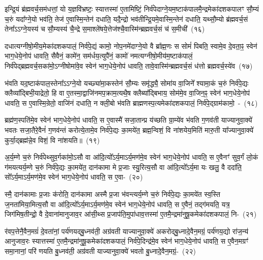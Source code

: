 इन्द्रि॒यं ब्र॑ह्मवर्च॒सम॑धत्तां॒ यो य॒ज्ञवि॑भ्रष्टः॒ स्यात्तस्मा॑ ए॒तामिष्टिं॒ निर्व॑पेदाग्ने॒यम॒ष्टाक॑पालमै॒न्द्रमेका॑\-दश\-कपालꣳ सौ॒म्यं च॒रुं यदा᳚ग्ने॒यो भव॑ति॒ तेज॑ ए॒वास्मि॒न्तेन॑ दधाति॒ यदै॒न्द्रो भव॑तीन्द्रि॒यमे॒वास्मि॒न्तेन॑ दधाति॒ यथ्सौ॒म्यो ब्र॑ह्मवर्च॒सं तेना᳚\-ऽऽ\-ग्ने॒यस्य॑ च सौ॒म्यस्य॑ चै॒न्द्रे स॒माश्ले॑षये॒त्तेज॑श्चै॒वास्मि॑न्ब्रह्मवर्च॒सं च॑ स॒मीची॑~(१६)

दधात्यग्नीषो॒मीय॒मेका॑\-दश\-कपालं॒ निर्व॑पे॒द्यं कामो॒ नोप॒नमे॑दा\-ग्ने॒यो वै ब्रा᳚ह्म॒णः स सोमं॑ पिबति॒ स्वामे॒व दे॒वता॒ꣴ॒ स्वेन॑ भाग॒धेये॒नोप॑ धावति॒ सैवैनं॒ कामे॑न॒ सम॑र्धय॒त्युपै॑नं॒ कामो॑ नमत्यग्नीषो॒मीय॑म॒ष्टा\-क॑पालं॒ निर्व॑पेद्ब्रह्मवर्च॒सका॑मो॒\-ऽग्नी\-षोमा॑वे॒व स्वेन॑ भाग॒धेये॒नोप॑ धावति॒ तावे॒वास्मि॑न्ब्रह्मवर्च॒सं ध॑त्तो ब्रह्मवर्च॒स्ये॑व~(१७)

भ॑वति यद॒ष्टाक॑पाल॒स्तेना᳚\-ऽऽ\-ग्ने॒यो यच्छ्या॑मा॒कस्तेन॑ सौ॒म्यः समृ॑द्ध्यै॒ सोमा॑य वा॒जिने᳚ श्यामा॒कं च॒रुं निर्व॑पे॒द्यः क्लैव्या᳚द्बिभी॒याद्रेतो॒ हि वा ए॒तस्मा॒द्वाजि॑नमप॒क्राम॒त्यथै॒ष क्लैब्या᳚द्बिभाय॒ सोम॑मे॒व वा॒जिन॒ꣴ॒ स्वेन॑ भाग॒धेये॒नोप॑ धावति॒ स ए॒वास्मि॒न्रेतो॒ वाजि॑नं दधाति॒ न क्ली॒बो भ॑वति ब्राह्मणस्प॒त्यमेका॑\-दश\-कपालं॒ निर्व॑पे॒द्ग्राम॑कामो॒~-~(१८)

ब्रह्म॑ण॒स्पति॑मे॒व स्वेन॑ भाग॒धेये॒नोप॑ धावति॒ स ए॒वास्मै॑ सजा॒तान्प्र य॑च्छति ग्रा॒म्ये॑व भ॑वति ग॒णव॑ती याज्यानुवा॒क्ये॑ भवतः सजा॒तैरे॒वैनं॑ ग॒णव॑न्तं करोत्ये॒तामे॒व निर्व॑पे॒द्यः का॒मये॑त॒ ब्रह्म॒न्विशं॒ वि ना॑शयेय॒मिति॑ मारु॒ती या᳚ज्यानुवा॒क्ये॑ कुर्या॒द्ब्रह्म॑न्ने॒व विशं॒ वि ना॑शयति॥~(१९)

{}%

अ॒र्य॒म्णे च॒रुं निर्व॑पेथ्सुव॒र्गका॑मो॒\-ऽसौ वा आ॑दि॒त्यो᳚\-ऽर्य॒मा\-ऽर्य॒मण॑मे॒व स्वेन॑ भाग॒धेये॒नोप॑ धावति॒ स ए॒वैनꣳ॑ सुव॒र्गं लो॒कं ग॑मयत्यर्य॒म्णे च॒रुं निर्व॑पे॒द्यः का॒मये॑त॒ दान॑कामा मे प्र॒जाः स्यु॒रित्य॒सौ वा आ॑दि॒त्यो᳚\-ऽर्य॒मा यः खलु॒ वै ददा॑ति॒ सो᳚\-ऽर्य॒मा\-ऽर्य॒मण॑मे॒व स्वेन॑ भाग॒धेये॒नोप॑ धावति॒ स ए॒वा-~(२०)

स्मै॒ दान॑कामाः प्र॒जाः क॑रोति॒ दान॑कामा अस्मै प्र॒जा भ॑वन्त्यर्य॒म्णे च॒रुं निर्व॑पे॒द्यः का॒मये॑त स्व॒स्ति ज॒नता॑मिया॒मित्य॒सौ वा आ॑दि॒त्यो᳚\-ऽर्य॒मा\-ऽर्य॒मण॑मे॒व स्वेन॑ भाग॒धेये॒नोप॑ धावति॒ स ए॒वैनं॒ तद्ग॑मयति॒ यत्र॒ जिग॑मिष॒तीन्द्रो॒ वै दे॒वाना॑मानुजाव॒र आ॑सी॒थ्स प्र॒जा\-प॑ति॒मुपा॑धाव॒त्तस्मा॑ ए॒तमै॒न्द्रमा॑नुषू॒कमेका॑\-दश\-कपालं॒ नि-~(२१)

र॑वप॒त्तेनै॒वैन॒मग्रं॑ दे॒वता॑नां॒ पर्य॑णयद्बु॒ध्नव॑ती॒ अग्र॑वती याज्यानुवा॒क्ये॑ अकरोद्बु॒ध्नादे॒वैन॒मग्रं॒ पर्य॑णय॒द्यो रा॑ज॒न्य॑ आनुजाव॒रः स्यात्तस्मा॑ ए॒तमै॒न्द्रमा॑नुषू॒कमेका॑\-दश\-कपालं॒ निर्व॑पे॒दिन्द्र॑मे॒व स्वेन॑ भाग॒धेये॒नोप॑ धावति॒ स ए॒वैन॒मग्रꣳ॑ समा॒नानां॒ परि॑ णयति बु॒ध्नव॑ती॒ अग्र॑वती याज्यानुवा॒क्ये॑ भवतो बु॒ध्नादे॒वैन॒मग्रं॒-~(२२)

